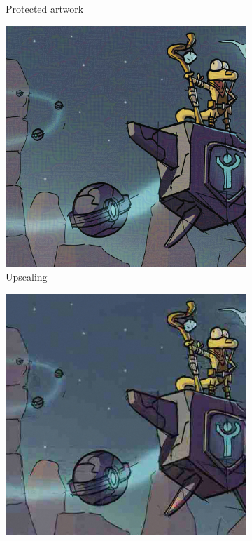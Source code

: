 \documentclass{article}
\begin{document}
\begin{figure}[h]
\begin{subfigure}[b]{0.195\textwidth}
         \caption{Protected artwork}
     \end{subfigure}
     \begin{subfigure}[b]{0.195\textwidth}
         \centering
         \includegraphics[width=\textwidth]{plots/noisyups/0001_nulevoy_upscaled.jpg}
         \caption{Upscaling}
     \end{subfigure}
     \begin{subfigure}[b]{0.195\textwidth}
         \centering
         \includegraphics[width=\textwidth]{plots/noisyups/0001_nulevoy_upscaled_compressed.jpg}

\end{subfigure}
\end{figure}
\end{document}
